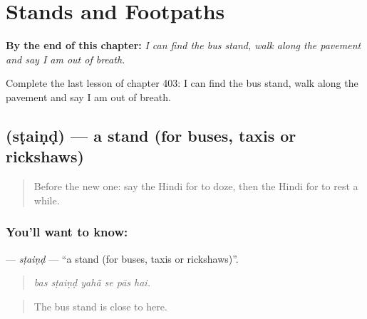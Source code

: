 
\chapter{Stands and Footpaths}
\label{ch:hi-stands-and-footpaths}

\begin{chapteropening}
\textbf{By the end of this chapter:} \emph{I can find the bus stand, walk along the pavement and say I am out of breath.}

Complete the last lesson of chapter 403: I can find the bus stand, walk along the pavement and say I am out of breath.
\end{chapteropening}

\section[\texorpdfstring{\hi{स्टैंड} (sṭaiṇḍ)}{स्टैंड (sṭaiṇḍ)}]{ (sṭaiṇḍ) — a stand (for buses, taxis or rickshaws)}

\label{lesson:HI-C403-staind}



\begin{quote}
Before the new one: say the Hindi for to doze, then the Hindi for to rest a while.
\end{quote}

\subsection*{You'll want to know: }
\textbf{} — \emph{sṭaiṇḍ} — \textquotedblleft{}a stand (for buses, taxis or rickshaws)\textquotedblright{}.

\begin{quote}
     
\end{quote}

\begin{quote}
\emph{bas sṭaiṇḍ yahā̃ se pās hai.}
\end{quote}

\begin{quote}
The bus stand is close to here.
\end{quote}

